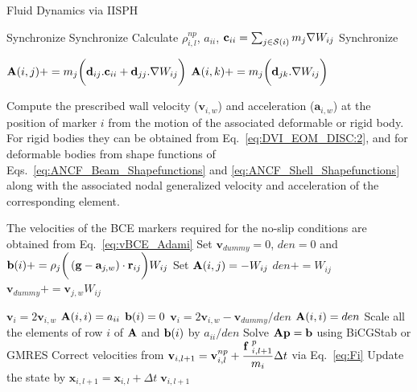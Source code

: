 \begin{algorithm}
	\caption{Fluid Dynamics via IISPH}
	{\fontsize{10}{10}\selectfont
		\begin{algorithmic}[1]
			  \ENDFOR
			\STATE    Synchronize
			  \ENDFOR
			\STATE    Synchronize
			\STATE Calculate $\rho_{i,l}^{np}$, $a_{ii}$, \AND   $\mathbf{c}_{ii}=\sum_{j \in {\cal S}(i)} m_j \nabla W_{ij}$
			\ENDFOR
			\STATE    Synchronize
			
			\STATE  ${\bf A}(i,j)+=m_j  \bigg( \mathbf{d}_{ij}.\mathbf{c}_{ii} + \mathbf{d}_{jj}. \nabla W_{ij} \bigg)$
			\STATE  ${\bf A}(i,k)+=m_j  \bigg(  \mathbf{d}_{jk}. \nabla W_{ij} \bigg)$
			\ENDFOR
			\ENDFOR
			\ENDIF
			\ENDFOR
			
			\STATE Compute the prescribed wall velocity ($\mathbf{v}_{i,w}$) and acceleration ($\mathbf{a}_{i,w}$) at the position of marker $i$ from the motion of the associated deformable or rigid body. For rigid bodies they can be obtained from Eq.~\ref{eq:DVI_EOM_DISC:2}, and for deformable bodies from shape functions of Eqs.~\ref{eq:ANCF_Beam_Shapefunctions} and \ref{eq:ANCF_Shell_Shapefunctions} along with the associated nodal generalized velocity and acceleration of the  corresponding element.
			
			\STATE The velocities of the BCE markers required for the no-slip conditions are obtained  from Eq.~\ref{eq:vBCE_Adami}
			\STATE  Set $\mathbf{v}_{dummy}=0$, $den=0$ and  
			\STATE ${\bf b}(i)+=\rho_j \bigg(\left( \mathbf{g} - \mathbf{a}_{j,w} \right) \cdot \mathbf{r}_{ij}\bigg) W_{ij}$
			\STATE Set ${\bf A}(i,j)=-W_{ij}$
			\STATE $den+=W_{ij}$ \AND $\mathbf{v}_{dummy}+=\mathbf{v}_{j,w} W_{ij}$
			\ENDFOR
			
			\STATE $\mathbf{v}_{i}=2\mathbf{v}_{i,w}$
			\STATE ${\bf A}(i,i)=a_{ii}$ \AND ${\bf b}(i)=0$
			\ELSE
			\STATE $\mathbf{v}_{i}=2\mathbf{v}_{i,w}-\mathbf{v}_{dummy}/den$
			\STATE ${\bf A}(i,i)=den$
			\STATE Scale all the elements of row $i$ of ${\bf A}$ and ${\bf b}(i)$ by $a_{ii}/den$ 
			\ENDIF
			\ENDFOR        
			\STATE Solve ${\bf A}{\bf p}={\bf b}$ using BiCGStab or GMRES
			\STATE Correct velocities from $\mathbf{v}_{i,l+1}=\mathbf{v}_{i,l}^{np}+ \dfrac{{\bf f}\;^{p}_{i,l+1}}{ m_i}\Delta t$ via Eq.~\ref{eq:Fi}
			\STATE Update the state by $\mathbf{x}_{i,l+1}=\mathbf{x}_{i,l}+ \Delta t \; \mathbf{v}_{i,l+1}$
			\ENDFOR
		\end{algorithmic}\label{al:A_Matrix}
	}
\end{algorithm}
